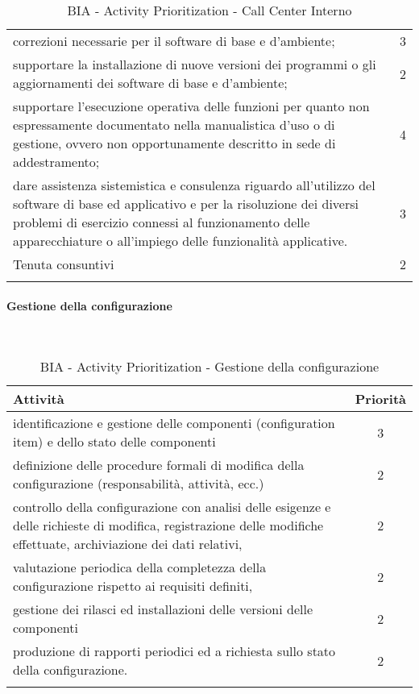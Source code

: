 \begin{longtable}{p{13cm} c }
correzioni necessarie per il software di base e d’ambiente; & 3 \\
supportare la installazione di nuove versioni dei programmi o gli aggiornamenti dei software di base e d'ambiente; &2\\
supportare   l'esecuzione   operativa   delle   funzioni   per   quanto   non   espressamente 
documentato nella manualistica d'uso o di gestione, ovvero non opportunamente descritto in sede di addestramento; & 4 \\
dare  assistenza  sistemistica  e  consulenza  riguardo  all’utilizzo  del  software  di  base  ed applicativo e per la risoluzione dei diversi problemi di esercizio connessi al funzionamento delle apparecchiature o all’impiego delle funzionalità applicative. & 3 \\
Tenuta consuntivi &2 \\
\bottomrule
\caption{BIA - Activity Prioritization - Call Center Interno}
\end{longtable}

\newpage
\paragraph{Gestione della configurazione}
\textcolor{white}{.} \\
\renewcommand\arraystretch{1,5}
\begin{longtable}{p{11cm} c }
\toprule
\textbf{Attività} & \textbf{Priorità} \\
\toprule
identificazione  e  gestione  delle  componenti  (configuration  item)  e  dello  stato  delle 
componenti   &3 \\
definizione  delle  procedure  formali  di  modifica  della  configurazione  (responsabilità, 
attività, ecc.)   & 2 \\
controllo  della  configurazione  con  analisi  delle  esigenze  e  delle  richieste  di  modifica, 
registrazione delle modifiche effettuate, archiviazione dei dati relativi,  & 2 \\
valutazione periodica della completezza della configurazione rispetto ai requisiti definiti, & 2 \\
gestione dei rilasci ed installazioni delle versioni delle componenti  & 2 \\
produzione di rapporti periodici ed a richiesta sullo stato della configurazione. & 2 \\
\bottomrule
\caption{BIA - Activity Prioritization - Gestione della configurazione}
\end{longtable}

